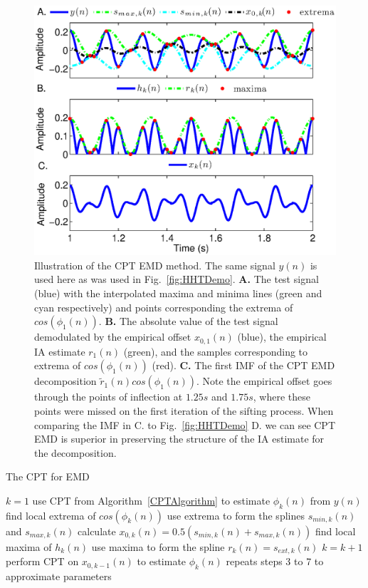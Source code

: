 \documentclass[journal,11pt,a4paper,onecolumn,draftcls]{IEEEtran}
\begin{document}
\begin{figure}
\centering
\includegraphics[scale=0.42]{./Figures/CPT_EMD_demo.eps}
\caption[CPT_EMD]{Illustration of the CPT EMD method. The same signal $y(n)$ is used here as was used in Fig.~\ref{fig:HHTDemo}. \textbf{A.} The test signal (blue) with the interpolated maxima and minima lines (green and cyan respectively) and points corresponding the extrema of $cos\left(\phi_1(n)\right)$. \textbf{B.} The absolute value of the test signal demodulated by the empirical offset $x_{0,1}(n)$ (blue), the empirical IA estimate $r_{1}(n)$ (green), and the samples corresponding to extrema of $cos\left(\phi_1\left(n\right)\right)$ (red). \textbf{C.} The first IMF of the CPT EMD decomposition $\tilde{r}_1(n)cos\left(\phi_1\left(n\right)\right)$. Note the empirical offset goes through the points of inflection at $1.25 s$ and $1.75s$, where these points were missed on the first iteration of the sifting process. When comparing the IMF in C. to Fig.~\ref{fig:HHTDemo} D. we can see CPT EMD is superior in preserving the structure of the IA estimate for the decomposition.}
\label{CPT_EMD}
\end{figure}

\begin{algorithm}
\caption{The CPT for EMD}\label{CPTEMDAlgorithm}
\begin{algorithmic}[1]
\State $k=1$
\State use CPT from Algorithm~\ref{CPTAlgorithm} to estimate $\phi_k(n)$ from $y(n)$
\State find local extrema of $cos\left(\phi_k(n)\right)$
\State use extrema to form the splines $s_{min,k}(n)$ and $s_{max,k}(n)$
\State calculate $x_{0,k}(n) = 0.5\left(s_{min,k}(n) + s_{max,k}(n)\right)$
\State find local maxima of $h_k(n)$
\State use maxima to form the spline $r_k(n) = s_{ext,k}(n)$
    \State $k=k+1$
    \State perform CPT on $x_{0,k-1}(n)$ to estimate $\phi_{k}(n)$
    \State repeats steps 3 to 7 to approximate parameters
\EndWhile

\end{algorithmic}
\end{algorithm}
\end{document}
